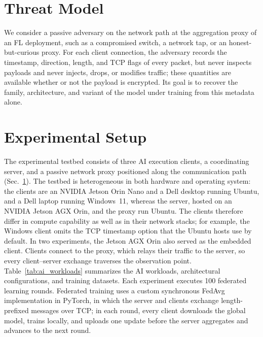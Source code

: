 \documentclass[conference]{IEEEtran}
\begin{document}
\section{Threat Model}
\label{sec:threat}
We consider a passive adversary on the network path at the aggregation proxy of
an FL deployment, such as a compromised switch, a network tap, or an
honest-but-curious proxy. For each client connection, the adversary records the
timestamp, direction, length, and TCP flags of every packet, but never inspects
payloads and never injects, drops, or modifies traffic; these quantities are
available whether or not the payload is encrypted. Its goal is to recover the
family, architecture, and variant of the model under training from this
metadata alone.

\section{Experimental Setup}
\label{sec:setup}
The experimental testbed consists of three AI execution clients, a coordinating
server, and a passive network proxy positioned along the communication path
(Sec.~\ref{sec:threat}).
The testbed is heterogeneous in both hardware and operating system: the clients
are an NVIDIA Jetson Orin Nano and a Dell desktop running Ubuntu, and a Dell
laptop running Windows~11, whereas the server, hosted on an NVIDIA Jetson AGX
Orin, and the proxy run Ubuntu. The clients therefore differ in compute
capability as well as in their network stacks; for example, the Windows client
omits the TCP timestamp option that the Ubuntu hosts use by default. In two
experiments, the Jetson AGX Orin also served as the embedded client. Clients
connect to the proxy, which relays their traffic to the server, so every
client--server exchange traverses the observation point. Table~\ref{tab:ai_workloads}
summarizes the AI workloads, architectural configurations, and training
datasets. Each experiment executes 100 federated learning rounds. Federated
training uses a custom synchronous FedAvg implementation in PyTorch, in which
the server and clients exchange length-prefixed messages over TCP; in each
round, every client downloads the global model, trains locally, and uploads one
update before the server aggregates and advances to the next round.
\end{document}
